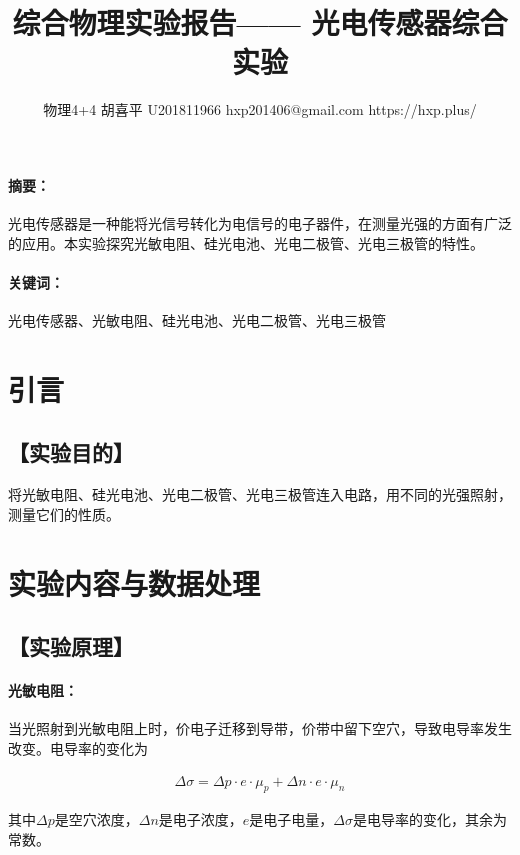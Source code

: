\documentclass{ctexart}
\date{}
\newcommand{\generatetitle}[6]{\title{\zihao{3}\heiti#1} \author{#2 \quad
    \quad #3 \quad\quad #4 \quad\quad #5 \quad\quad #6} \maketitle\thispagestyle{fancy}}
\let\oldsubsection\subsection
\renewcommand{\subsection}[1]{\oldsubsection{\!\!\!\!\!\!【#1】}}
\let\oldparagraph\paragraph
\renewcommand{\paragraph}[1]{\oldparagraph{#1：\!\!\!\!\!\!}}
\begin{document}
\generatetitle{综合物理实验报告——
  光电传感器综合实验}{物理4+4}{胡喜平}{U201811966}{hxp201406@gmail.com}{https://hxp.plus/}

\paragraph{摘要}
光电传感器是一种能将光信号转化为电信号的电子器件，在测量光强的方面有广泛的应用。本实验探究光敏电阻、硅光电池、光电二极管、光电三极管的特性。

\paragraph{关键词}
光电传感器、光敏电阻、硅光电池、光电二极管、光电三极管

\section{引言}
\subsection{实验目的}

将光敏电阻、硅光电池、光电二极管、光电三极管连入电路，用不同的光强照射，测量它们的性质。

\section{实验内容与数据处理}
\subsection{实验原理}

\paragraph{光敏电阻}

当光照射到光敏电阻上时，价电子迁移到导带，价带中留下空穴，导致电导率发生改变。电导率的变化为

\begin{equation*}
  \begin{aligned}
    \Delta \sigma = \Delta p \cdot e \cdot \mu_p + \Delta n \cdot e \cdot \mu_n
  \end{aligned}
\end{equation*}

其中$\Delta p$是空穴浓度，$\Delta n$是电子浓度，$e$是电子电量，$\Delta \sigma$是电导率的变化，其余为常数。
\end{document}
